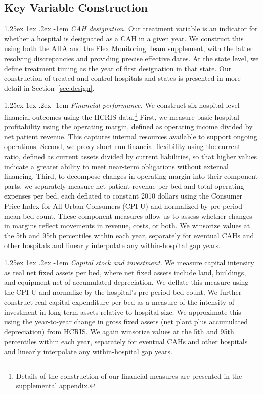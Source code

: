 \documentclass[a4paper, 12pt, twoside]{article}
\makeatletter
\renewcommand\paragraph{\@startsection{paragraph}{4}{\z@}%
   {1.25ex \@plus 1ex \@minus .2ex}%
   {-1em}%
   {\normalfont\itshape}}
\makeatother
\begin{document}
\subsection{Key Variable Construction}

\paragraph{\textit{CAH designation.}}  
Our treatment variable is an indicator for whether a hospital is designated as a CAH in a given year. We construct this using both the AHA and the Flex Monitoring Team supplement, with the latter resolving discrepancies and providing precise effective dates. At the state level, we define treatment timing as the year of first designation in that state. Our construction of treated and control hospitals and states is presented in more detail in Section~\ref{sec:design}.

\paragraph{\textit{Financial performance.}}
We construct six hospital-level financial outcomes using the HCRIS data.\footnote{Details of the construction of our financial measures are presented in the supplemental appendix.} First, we measure basic hospital profitability using the operating margin, defined as operating income divided by net patient revenue. This captures internal resources available to support ongoing operations. Second, we proxy short-run financial flexibility using the current ratio, defined as current assets divided by current liabilities, so that higher values indicate a greater ability to meet near-term obligations without external financing. Third, to decompose changes in operating margin into their component parts, we separately measure net patient revenue per bed and total operating expenses per bed, each deflated to constant 2010 dollars using the Consumer Price Index for All Urban Consumers (CPI-U) and normalized by pre-period mean bed count. These component measures allow us to assess whether changes in margins reflect movements in revenue, costs, or both. We winsorize values at the 5th and 95th percentiles within each year, separately for eventual CAHs and other hospitals and linearly interpolate any within-hospital gap years.

\paragraph{\textit{Capital stock and investment.}}
We measure capital intensity as real net fixed assets per bed, where net fixed assets include land, buildings, and equipment net of accumulated depreciation. We deflate this measure using the CPI-U and normalize by the hospital's pre-period bed count. We further construct real capital expenditure per bed as a measure of the intensity of investment in long-term assets relative to hospital size. We approximate this using the year-to-year change in gross fixed assets (net plant plus accumulated depreciation) from HCRIS. We again winsorize values at the 5th and 95th percentiles within each year, separately for eventual CAHs and other hospitals and linearly interpolate any within-hospital gap years.
\end{document}
